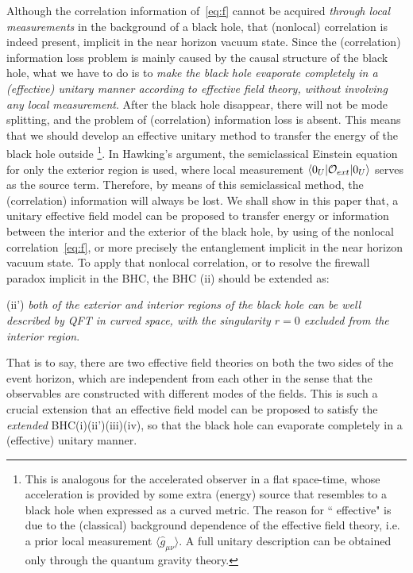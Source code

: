 \documentclass[12pt,a4paper]{article}
\begin{document}
Although the correlation information of~\eqref{eq:f} cannot be acquired \emph{through local measurements} in the background of a black hole, that (nonlocal) correlation is indeed present, implicit in the near horizon vacuum state. Since the (correlation) information loss problem is mainly caused by the causal structure of the black hole, what we have to do is to \emph{make the black hole evaporate completely in a (effective) unitary manner according to effective field theory, without involving any local measurement}. After the black hole disappear, there will not be mode splitting, and the problem of (correlation) information loss is absent. This means that we should develop an effective unitary method to transfer the energy of the black hole outside \footnote{This is analogous for the accelerated observer in a flat space-time, whose acceleration is provided by some extra (energy) source that resembles to a black hole when expressed as a curved metric. The reason for `` effective" is due to the (classical) background dependence of the effective field theory, i.e. a prior local measurement $\langle \hat{g}_{\mu\nu}\rangle$. A full unitary description can be obtained only through the quantum gravity theory. }. In Hawking's argument, the semiclassical Einstein equation for only the exterior region is used, where local measurement $\langle 0_{U}\arrowvert\mathcal{O}_{ext}\arrowvert0_{U}\rangle$ serves as the source term. Therefore, by means of this semiclassical method, the (correlation) information will always be lost. We shall show in this paper that, a unitary effective field model can be proposed to transfer energy or information between the interior and the exterior of the black hole, by using of the nonlocal correlation~\eqref{eq:f}, or more precisely the entanglement implicit in the near horizon vacuum state. To apply that nonlocal correlation, or to resolve the firewall paradox implicit in the BHC, the BHC (ii) should be extended as:

(ii') \emph{both of the exterior and interior regions of the black hole can be well described by
QFT in curved space, with the singularity $r=0$ excluded from the interior region}.

That is to say, there are two effective field theories on both the two sides of the event horizon, which are independent from each other in the sense that the observables are constructed with different modes of the fields. This is such a crucial extension that an effective field model can be proposed to satisfy the \emph{extended} BHC(i)(ii')(iii)(iv), so that the black hole can evaporate completely in a (effective) unitary manner.
\end{document}
